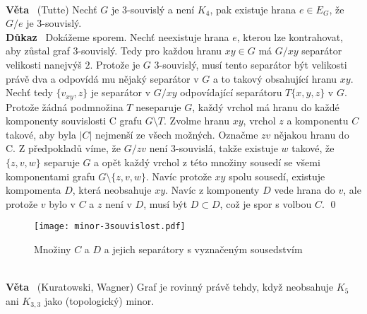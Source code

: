 \documentclass{article}
\renewcommand{\paragraph}[1]{\ \\\smallskip\noindent\textbf{#1}\ }
\begin{document}
\paragraph{Věta} (Tutte) Nechť $G$ je 3-souvislý a není $K_4$, pak existuje 
hrana $e\in E_G$, že $G/e$ je 3-souvislý.
\paragraph{Důkaz}
Dokážeme sporem. Nechť neexistuje hrana $e$, kterou lze kontrahovat, aby zůstal 
graf 3-souvislý. Tedy pro každou hranu $xy\in G$ má $G/xy$ separátor velikosti 
nanejvýš $2$. Protože je $G$ 3-souvislý, musí tento separátor být velikosti 
právě dva a odpovídá mu nějaký separátor v $G$ a to takový obsahující hranu 
$xy$. Nechť tedy $\{v_{xy},z\}$ je separátor v $G/xy$ odpovídající separátoru $
T \{x,y,z\}$ v $G$. Protože žádná podmnožina $T$ neseparuje $G$, každý vrchol má 
hranu do každé komponenty souvislosti C grafu $G\setminus T$. Zvolme hranu $xy$,
vrchol $z$ a komponentu $C$ takové, aby byla $|C|$ nejmenší ze všech možných.  
Označme $zv$ nějakou hranu do C. Z předpokladů víme, že $G/zv$ není 3-souvislá, 
takže existuje $w$ takové, že $\{z,v,w\}$ separuje $G$ a opět každý vrchol z 
této množiny sousedí se všemi komponentami grafu $G\setminus\{z,v,w\}$. Navíc 
protože $xy$ spolu sousedí, existuje kompomenta $D$, která neobsahuje $xy$.  
Navíc z komponenty $D$ vede hrana do $v$, ale protože $v$ bylo v $C$ a $z$ není 
v $D$, musí být $D\subset D$, což je spor s volbou $C$.
\qed
\begin{figure}[H]
\centering
\texttt{[image: minor-3souvislost.pdf]}
\caption{Množiny $C$ a $D$ a jejich separátory s vyznačeným sousedstvím}
\label{minory:kontrakce}
\end{figure}

\paragraph{Věta} (Kuratowski, Wagner) Graf je rovinný právě tehdy, když 
neobsahuje $K_5$ ani $K_{3,3}$ jako (topologický) minor.
\end{document}
